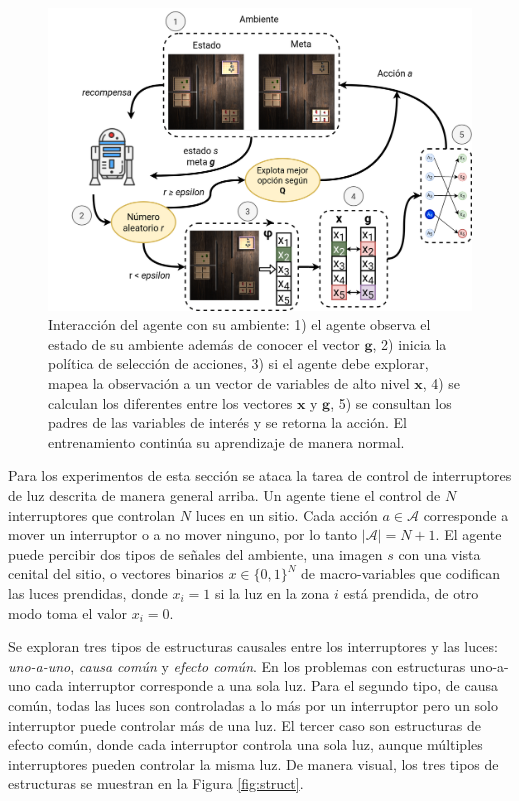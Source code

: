  \begin{figure}
     \centering
     \includegraphics[scale=0.2]{Chapter4/Figs/example_method.png}
     \caption{Interacción del agente con su ambiente: 1) el agente observa el estado de su ambiente además de conocer el vector $\mathbf{g}$, 2) inicia
     la política de selección de acciones, 3) si el agente debe explorar, mapea la observación a un vector de variables de alto nivel $\mathbf{x}$, 4) se calculan los diferentes entre los vectores $\mathbf{x}$ y $\mathbf{g}$, 5) se consultan los padres de las variables de interés y se retorna la acción. El entrenamiento continúa su aprendizaje de manera normal.}
     \label{fig:example-switches}
 \end{figure}
 
Para los experimentos de esta sección se ataca la tarea de control de interruptores de luz descrita de manera general arriba. Un agente tiene el control
de $N$ interruptores que controlan $N$ luces en un sitio.
Cada acción $a\in \mathcal{A}$ corresponde a mover un interruptor o 
a no mover ninguno, por lo tanto $|\mathcal{A}| = N + 1$.
El agente puede percibir dos tipos de señales del ambiente,
una imagen $s$ con una vista cenital del sitio, o vectores binarios $x \in \{0,1\}^N$ de 
macro-variables que codifican las luces prendidas, donde
$x_i = 1$ si la luz en la zona $i$ está prendida, de otro modo 
toma el valor $x_i = 0$.

Se exploran tres tipos de estructuras causales entre los
interruptores y las luces: \textit{uno-a-uno},
\textit{causa común} y \textit{efecto común}.
En los problemas con estructuras uno-a-uno cada interruptor corresponde a una sola luz.
Para el segundo tipo, de causa común, todas
las luces son controladas a lo más por un interruptor pero un
solo interruptor puede controlar más de una luz.
El tercer caso son estructuras de efecto común, donde cada interruptor
controla una sola luz, aunque múltiples interruptores
pueden controlar la misma luz. De manera visual, los tres tipos de estructuras
se muestran en la Figura \ref{fig:struct}.

